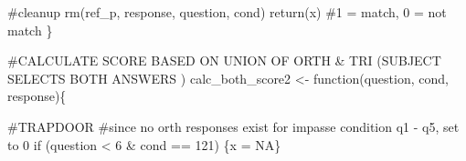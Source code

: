 \documentclass[
  letterpaper,
  DIV=11,
  numbers=noendperiod]{scrreprt}
\newenvironment{Shaded}{\begin{snugshade}}{\end{snugshade}}
\newcommand{\CommentTok}[1]{\textcolor[rgb]{0.37,0.37,0.37}{#1}}
\newcommand{\ConstantTok}[1]{\textcolor[rgb]{0.56,0.35,0.01}{#1}}
\newcommand{\ControlFlowTok}[1]{\textcolor[rgb]{0.00,0.23,0.31}{#1}}
\newcommand{\DecValTok}[1]{\textcolor[rgb]{0.68,0.00,0.00}{#1}}
\newcommand{\FunctionTok}[1]{\textcolor[rgb]{0.28,0.35,0.67}{#1}}
\newcommand{\NormalTok}[1]{\textcolor[rgb]{0.00,0.23,0.31}{#1}}
\newcommand{\OtherTok}[1]{\textcolor[rgb]{0.00,0.23,0.31}{#1}}
\newcommand{\SpecialCharTok}[1]{\textcolor[rgb]{0.37,0.37,0.37}{#1}}
\begin{document}
\begin{Shaded}
\begin{Highlighting}[]
    \CommentTok{\#cleanup}
    \FunctionTok{rm}\NormalTok{(ref\_p, response, question, cond)   }
    \FunctionTok{return}\NormalTok{(x) }\CommentTok{\#1 = match, 0 = not match}
\NormalTok{\}}

\CommentTok{\#CALCULATE SCORE BASED ON UNION OF ORTH \& TRI (SUBJECT SELECTS BOTH ANSWERS )}
\NormalTok{calc\_both\_score2 }\OtherTok{\textless{}{-}} \ControlFlowTok{function}\NormalTok{(question, cond, response)\{}
  
  
  \CommentTok{\#TRAPDOOR }
  \CommentTok{\#since no orth responses exist for impasse condition q1 {-} q5, set to 0}
  \ControlFlowTok{if}\NormalTok{ (question }\SpecialCharTok{\textless{}} \DecValTok{6} \SpecialCharTok{\&}\NormalTok{ cond }\SpecialCharTok{==} \DecValTok{121}\NormalTok{) \{x }\OtherTok{=} \ConstantTok{NA}\NormalTok{\}}
  

\end{Highlighting}
\end{Shaded}
\end{document}

